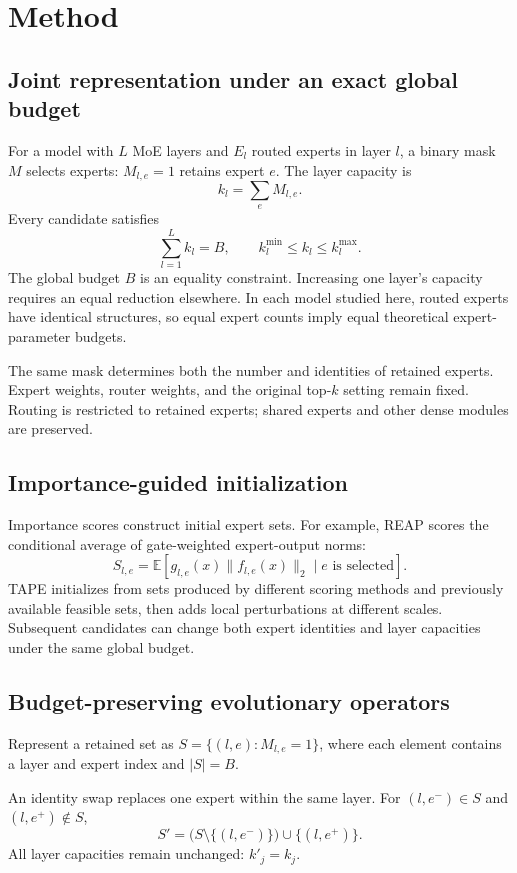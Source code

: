 \documentclass{article}
\begin{document}
\section{Method}
\label{sec:3}
\subsection{Joint representation under an exact global budget}
\label{sec:3.1}
For a model with $L$ MoE layers and $E_l$ routed experts in layer $l$, a binary mask $M$ selects experts: $M_{l,e}=1$ retains expert $e$. The layer capacity is
\[
k_l=\sum_e M_{l,e}.
\]
Every candidate satisfies
\[
\sum_{l=1}^{L}k_l=B,\qquad
k_l^{\min}\leq k_l\leq k_l^{\max}.
\]
The global budget $B$ is an equality constraint. Increasing one layer's capacity requires an equal reduction elsewhere. In each model studied here, routed experts have identical structures, so equal expert counts imply equal theoretical expert-parameter budgets.

The same mask determines both the number and identities of retained experts. Expert weights, router weights, and the original top-$k$ setting remain fixed. Routing is restricted to retained experts; shared experts and other dense modules are preserved.

\subsection{Importance-guided initialization}
\label{sec:3.2}
Importance scores construct initial expert sets. For example, REAP scores the conditional average of gate-weighted expert-output norms:
\[
S_{l,e}=\mathbb{E}\left[
g_{l,e}(x)\lVert f_{l,e}(x)\rVert_2
\mid e\text{ is selected}\right].
\]
TAPE initializes from sets produced by different scoring methods and previously available feasible sets, then adds local perturbations at different scales. Subsequent candidates can change both expert identities and layer capacities under the same global budget.

\subsection{Budget-preserving evolutionary operators}
\label{sec:3.3}
Represent a retained set as $S=\{(l,e):M_{l,e}=1\}$, where each element contains a layer and expert index and $|S|=B$.

An identity swap replaces one expert within the same layer. For $(l,e^-)\in S$ and $(l,e^+)\notin S$,
\[
S'=\bigl(S\setminus\{(l,e^-)\}\bigr)\cup\{(l,e^+)\}.
\]
All layer capacities remain unchanged: $k'_j=k_j$.
\end{document}
